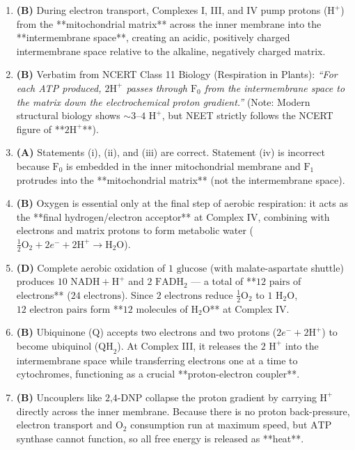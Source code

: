 \documentclass[11pt, a4paper]{article}
\begin{document}
\begin{enumerate}[label=\textbf{\arabic*.}]
\item \textbf{(B)} During electron transport, Complexes I, III, and IV pump protons ($\text{H}^+$) from the **mitochondrial matrix** across the inner membrane into the **intermembrane space**, creating an acidic, positively charged intermembrane space relative to the alkaline, negatively charged matrix.

\item \textbf{(B)} Verbatim from NCERT Class 11 Biology (Respiration in Plants): \textit{``For each ATP produced, $2\text{H}^+$ passes through $\text{F}_0$ from the intermembrane space to the matrix down the electrochemical proton gradient.''} (Note: Modern structural biology shows $\sim 3\text{--}4\text{ H}^+$, but NEET strictly follows the NCERT figure of **$2\text{H}^+$**).

\item \textbf{(A)} Statements (i), (ii), and (iii) are correct. Statement (iv) is incorrect because $\text{F}_0$ is embedded in the inner mitochondrial membrane and $\text{F}_1$ protrudes into the **mitochondrial matrix** (not the intermembrane space).

\item \textbf{(B)} Oxygen is essential only at the final step of aerobic respiration: it acts as the **final hydrogen/electron acceptor** at Complex IV, combining with electrons and matrix protons to form metabolic water ($\frac{1}{2}\text{O}_2 + 2e^- + 2\text{H}^+ \rightarrow \text{H}_2\text{O}$).

\item \textbf{(D)} Complete aerobic oxidation of $1\text{ glucose}$ (with malate-aspartate shuttle) produces $10\text{ NADH} + \text{H}^+$ and $2\text{ FADH}_2$ — a total of **$12\text{ pairs}$ of electrons** ($24\text{ electrons}$). Since $2\text{ electrons}$ reduce $\frac{1}{2}\text{O}_2$ to $1\text{ H}_2\text{O}$, $12\text{ electron pairs}$ form **$12\text{ molecules}$ of $\text{H}_2\text{O}$** at Complex IV.

\item \textbf{(B)} Ubiquinone ($\text{Q}$) accepts two electrons and two protons ($2e^- + 2\text{H}^+$) to become ubiquinol ($\text{QH}_2$). At Complex III, it releases the $2\text{ H}^+$ into the intermembrane space while transferring electrons one at a time to cytochromes, functioning as a crucial **proton-electron coupler**.

\item \textbf{(B)} Uncouplers like $\text{2,4-DNP}$ collapse the proton gradient by carrying $\text{H}^+$ directly across the inner membrane. Because there is no proton back-pressure, electron transport and $\text{O}_2$ consumption run at maximum speed, but $\text{ATP}$ synthase cannot function, so all free energy is released as **heat**.


\end{enumerate}
\end{document}
